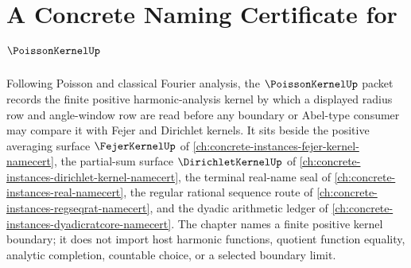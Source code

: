 \chapter{A Concrete Naming Certificate for $\PoissonKernelUp$}
\label{ch:concrete-instances-poisson-kernel-namecert}

Following Poisson and classical Fourier analysis, the $\PoissonKernelUp$ packet records the finite positive harmonic-analysis kernel by which a displayed radius row and angle-window row are read before any boundary or Abel-type consumer may compare it with Fejer and Dirichlet kernels. It sits beside the positive averaging surface $\FejerKernelUp$ of \autoref{ch:concrete-instances-fejer-kernel-namecert}, the partial-sum surface $\DirichletKernelUp$ of \autoref{ch:concrete-instances-dirichlet-kernel-namecert}, the terminal real-name seal of \autoref{ch:concrete-instances-real-namecert}, the regular rational sequence route of \autoref{ch:concrete-instances-regseqrat-namecert}, and the dyadic arithmetic ledger of \autoref{ch:concrete-instances-dyadicratcore-namecert}. The chapter names a finite positive kernel boundary; it does not import host harmonic functions, quotient function equality, analytic completion, countable choice, or a selected boundary limit.

